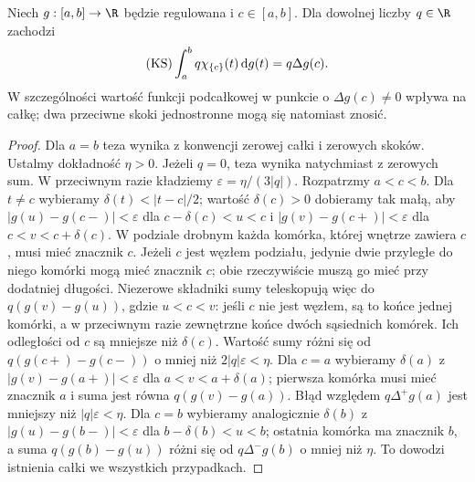 \begin{lemat}
\label{lem:ks-point}
Niech $g:[a,b]\to\R$ będzie regulowana i $c\in[a,b]$. Dla dowolnej liczby $q\in\R$ zachodzi
\[
 (\mathrm{KS})\int_a^b q\chi_{\{c\}}(t)\,\mathrm dg(t)=q\Delta g(c).
\]
W szczególności wartość funkcji podcałkowej w punkcie o $\Delta g(c)\ne0$ wpływa na całkę; dwa przeciwne skoki jednostronne mogą się natomiast znosić.
\end{lemat}
\begin{proof}
Dla $a=b$ teza wynika z konwencji zerowej całki i zerowych skoków. Ustalmy dokładność $\eta>0$. Jeżeli $q=0$, teza wynika natychmiast z zerowych sum. W przeciwnym razie kładziemy $\varepsilon=\eta/(3|q|)$. Rozpatrzmy $a<c<b$. Dla $t\ne c$ wybieramy $\delta(t)<|t-c|/2$; wartość $\delta(c)>0$ dobieramy tak małą, aby $|g(u)-g(c-)|<\varepsilon$ dla $c-\delta(c)<u<c$ i $|g(v)-g(c+)|<\varepsilon$ dla $c<v<c+\delta(c)$. W podziale drobnym każda komórka, której wnętrze zawiera $c$, musi mieć znacznik $c$. Jeżeli $c$ jest węzłem podziału, jedynie dwie przyległe do niego komórki mogą mieć znacznik $c$; obie rzeczywiście muszą go mieć przy dodatniej długości. Niezerowe składniki sumy teleskopują więc do $q(g(v)-g(u))$, gdzie $u<c<v$: jeśli $c$ nie jest węzłem, są to końce jednej komórki, a w przeciwnym razie zewnętrzne końce dwóch sąsiednich komórek. Ich odległości od $c$ są mniejsze niż $\delta(c)$. Wartość sumy różni się od $q(g(c+)-g(c-))$ o mniej niż $2|q|\varepsilon<\eta$. Dla $c=a$ wybieramy $\delta(a)$ z $|g(v)-g(a+)|<\varepsilon$ dla $a<v<a+\delta(a)$; pierwsza komórka musi mieć znacznik $a$ i suma jest równa $q(g(v)-g(a))$. Błąd względem $q\Delta^+g(a)$ jest mniejszy niż $|q|\varepsilon<\eta$. Dla $c=b$ wybieramy analogicznie $\delta(b)$ z $|g(u)-g(b-)|<\varepsilon$ dla $b-\delta(b)<u<b$; ostatnia komórka ma znacznik $b$, a suma $q(g(b)-g(u))$ różni się od $q\Delta^-g(b)$ o mniej niż $\eta$. To dowodzi istnienia całki we wszystkich przypadkach.
\end{proof}

